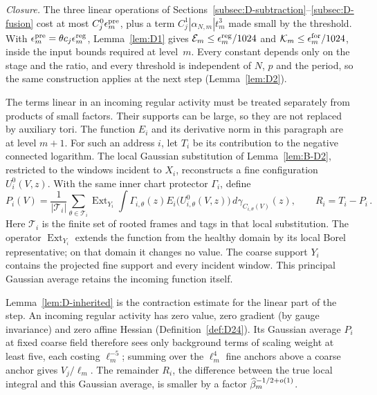 \emph{Closure.} The three linear operations of Sections~\ref{subsec:D-subtraction}--\ref{subsec:D-fusion} cost at most $C^0_j\epsilon^{\rm pre}_m$, plus a term $C^1_j|\alpha_{N,m}|t_m^3$ made small by the threshold. With $\epsilon^{\rm pre}_m=\theta c_j\epsilon^{\rm reg}_m$, Lemma~\ref{lem:D1} gives $\mathcal E_m\le\epsilon^{\rm reg}_m/1024$ and $\mathcal K_m\le\epsilon^{\rm for}_m/1024$, inside the input bounds required at level~$m$. Every constant depends only on the stage and the ratio, and every threshold is independent of $N$, $p$ and the period, so the same construction applies at the next step (Lemma~\ref{lem:D2}).

The terms linear in an incoming regular activity must be treated separately from products of small factors. Their supports can be large, so they are not replaced by auxiliary tori. The function $E_i$ and its derivative norm in this paragraph are at level $m+1$. For such an address $i$, let $T_i$ be its contribution to the negative connected logarithm. The local Gaussian substitution of Lemma~\ref{lem:B-D2}, restricted to the windows incident to $X_i$, reconstructs a fine configuration $U_i^0(V,z)$. With the same inner chart protector $\Gamma_i$, define
\begin{equation*}
P_i(V)=\frac1{|\mathcal T_i|}\sum_{\theta\in\mathcal T_i}
\operatorname{Ext}_{Y_i}\int\Gamma_{i,\theta}(z)
 E_i\bigl(U_{i,\theta}^0(V,z)\bigr)\,d\gamma_{C_{i,\theta}(V)}(z),
\qquad R_i=T_i-P_i\,.
\end{equation*}
Here $\mathcal T_i$ is the finite set of rooted frames and tags in that local substitution. The operator $\operatorname{Ext}_{Y_i}$ extends the function from the healthy domain by its local Borel representative; on that domain it changes no value. The coarse support $Y_i$ contains the projected fine support and every incident window. This principal Gaussian average retains the incoming function itself.

Lemma~\ref{lem:D-inherited} is the contraction estimate for the linear part of the step. An incoming regular activity has zero value, zero gradient (by gauge invariance) and zero affine Hessian (Definition~\ref{def:D24}). Its Gaussian average $P_i$ at fixed coarse field therefore sees only background terms of scaling weight at least five, each costing $\ell_m^{-5}$; summing over the $\ell_m^4$ fine anchors above a coarse anchor gives $V_j/\ell_m$. The remainder $R_i$, the difference between the true local integral and this Gaussian average, is smaller by a factor $\widehat{\beta}_m^{-1/2+o(1)}$.

